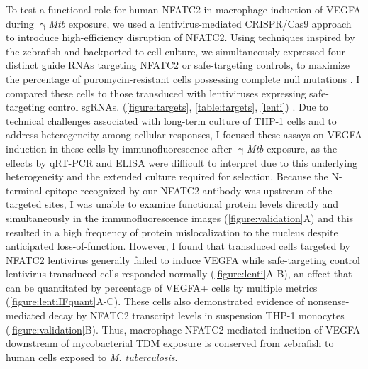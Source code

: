 To test a functional role for human NFATC2 in macrophage induction of VEGFA during $\upgamma$\textit{Mtb} exposure, we used a lentivirus\hyp{}mediated CRISPR/Cas9 approach to introduce high\hyp{}efficiency disruption of NFATC2. Using techniques inspired by the zebrafish and backported to cell culture, we simultaneously expressed four distinct guide RNAs targeting NFATC2 or safe\hyp{}targeting controls, to maximize the percentage of puromycin\hyp{}resistant cells possessing complete null mutations \citep{Wu2018}. I compared these cells to those transduced with lentiviruses expressing safe\hyp{}targeting control sgRNAs. (\autoref{figure:targets}, \autoref{table:targets}, \autoref{lenti}) \citep{Kabadi2014, Sanjana2014, Morgens2017, Kitamura2021}. Due to technical challenges associated with long\hyp{}term culture of THP\hyp{}1 cells and to address heterogeneity among cellular responses, I focused these assays on VEGFA induction in these cells by immunofluorescence after $\upgamma$\textit{Mtb} exposure, as the effects by qRT\hyp{}PCR and ELISA were difficult to interpret due to this underlying heterogeneity and the extended culture required for selection. Because the N\hyp{}terminal epitope recognized by our NFATC2 antibody was upstream of the targeted sites, I was unable to examine functional protein levels directly and simultaneously in the immunofluorescence images (\autoref{figure:validation}A) and this resulted in a high frequency of protein mislocalization to the nucleus despite anticipated loss\hyp{}of\hyp{}function. However, I found that transduced cells targeted by NFATC2 lentivirus generally failed to induce VEGFA while safe\hyp{}targeting control lentivirus\hyp{}transduced cells responded normally (\autoref{figure:lenti}A\hyp{}B), an effect that can be quantitated by percentage of VEGFA+ cells by multiple metrics (\autoref{figure:lentiIFquant}A\hyp{}C). These cells also demonstrated evidence of nonsense\hyp{}mediated decay by NFATC2 transcript levels in suspension THP\hyp{}1 monocytes (\autoref{figure:validation}B). Thus, macrophage NFATC2\hyp{}mediated induction of VEGFA downstream of mycobacterial TDM exposure is conserved from zebrafish to human cells exposed to \textit{M. tuberculosis}.

